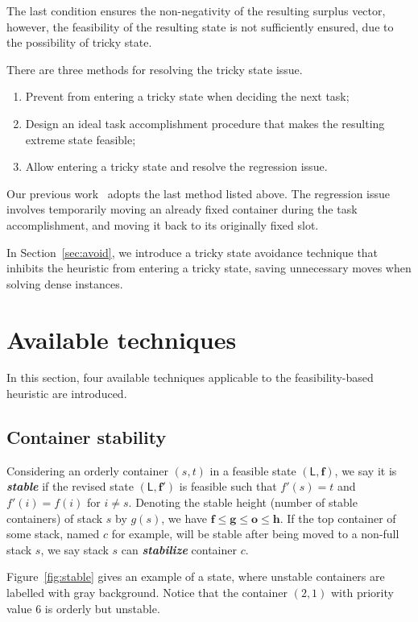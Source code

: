 \documentclass[review,3p,times,12pt,number]{elsarticle}\usepackage{amsmath}\usepackage{amssymb}
\renewcommand{\emph}[1]{\textbf{\textit{#1}}}
\begin{document}
The last condition ensures the non-negativity of the resulting surplus vector, however, the feasibility of the resulting state is not sufficiently ensured, due to the possibility of tricky state.

There are three methods for resolving the tricky state issue.
\begin{enumerate}
\item Prevent from entering a tricky state when deciding the next task;
\item Design an ideal task accomplishment procedure that makes the resulting extreme state feasible;
\item Allow entering a tricky state and resolve the regression issue.
\end{enumerate}

Our previous work~\citep{wang2015} adopts the last method listed above. The regression issue involves temporarily moving an already fixed container during the task accomplishment, and moving it back to its originally fixed slot.

In Section~\ref{sec:avoid}, we introduce a tricky state avoidance technique that inhibits  the heuristic from entering a tricky state, saving unnecessary moves when solving dense instances.



\section{Available techniques}
\label{sec:technique}
In this section, four available techniques applicable to the feasibility-based heuristic are introduced.

\subsection{Container stability}

Considering an orderly container $(s,t)$ in a feasible state $(\mathsf{L},\boldsymbol{f})$, we say it is \emph{stable} if the revised state $(\mathsf{L},\boldsymbol{f}')$ is feasible such that $f'(s)=t$ and $f'(i)=f(i)$ for $i\neq s$. Denoting the stable height (number of stable containers) of stack $s$ by $ g(s)$, we have $\boldsymbol{f}\le \boldsymbol{ g}\le \boldsymbol{o}\le \boldsymbol{h}$. If the top container of some stack, named $c$ for example, will be stable after being moved to a non-full stack $s$, we say stack $s$ can \emph{stabilize} container $c$.

Figure~\ref{fig:stable} gives an example of a state, where unstable containers are labelled with gray background. Notice that the container $(2,1)$ with priority value $6$ is orderly but unstable.
\end{document}
